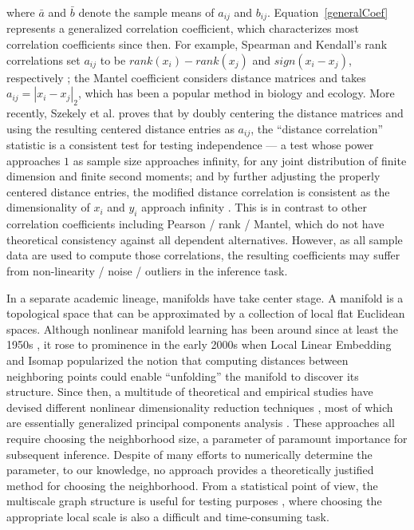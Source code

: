 \documentclass[11pt]{article}
\begin{document}
where $\bar{a}$ and $\bar{b}$ denote the sample means of $a_{ij}$ and $b_{ij}$. Equation~\ref{generalCoef} represents a generalized correlation coefficient, which characterizes most correlation coefficients since then.  For example, Spearman and Kendall's rank correlations set $a_{ij}$ to be $rank(x_i)-rank(x_j)$ and $sign(x_i-x_j)$, respectively \cite{KendallBook}; the Mantel coefficient \cite{Mantel1967} considers distance matrices and takes $a_{ij}=|x_i-x_j|_{2}$, which has been a popular method in biology and ecology. More recently, Szekely et al. \cite{SzekelyRizzoBakirov2007} proves that by doubly centering the distance matrices and using the resulting centered distance entries as $a_{ij}$, the ``distance correlation'' statistic is a consistent test for testing independence --- a test whose power approaches $1$ as sample size approaches infinity, for any joint distribution of finite dimension and finite second moments; and by further adjusting the properly centered distance entries, the modified distance correlation is consistent as the dimensionality of $x_{i}$ and $y_{i}$ approach infinity \cite{SzekelyRizzo2013a}. This is in contrast to other correlation coefficients including Pearson / rank / Mantel, which do not have theoretical consistency against all dependent alternatives. However, as all sample data are used to compute those correlations, the resulting coefficients may suffer from non-linearity / noise / outliers in the inference task.

In a separate academic lineage, manifolds have take center stage.  A manifold is a topological space that can be approximated by a collection of local flat Euclidean spaces.  Although nonlinear manifold learning has been around since at least the 1950s \cite{TorgersonBook}, it rose to prominence in the early 2000s when Local Linear Embedding \cite{SaulRoweis2000} and Isomap \cite{TenenbaumSilvaLangford2000} popularized the notion that computing distances between neighboring points could enable ``unfolding'' the manifold to discover its structure.  Since then, a multitude of theoretical and empirical studies have devised different nonlinear dimensionality reduction techniques \cite{LeeVerleysen2007}, most of which are essentially generalized principal components analysis \cite{ScholkopfSmolaMuller1999}.  These approaches all require choosing the neighborhood size, a parameter of paramount importance for subsequent inference. Despite of many efforts to numerically determine the parameter, to our knowledge, no approach provides a theoretically justified method for choosing the neighborhood. From a statistical point of view, the multiscale graph structure is useful for testing purposes \cite{David1966,Friedman1983,Schilling1986,Dumcke2014,HHG2016}, where choosing the appropriate local scale is also a difficult and time-consuming task. 
\end{document}
